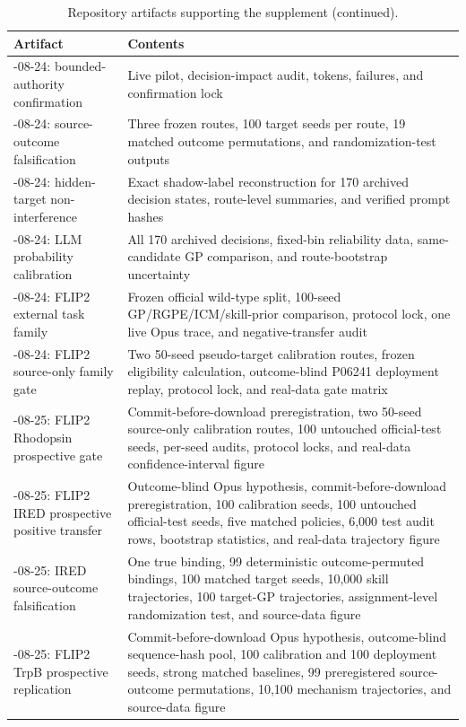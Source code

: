 \documentclass[pdflatex,sn-nature]{sn-jnl}
\begin{document}
\begin{appendices}
\begin{table}[!htbp]
\centering
\caption{Repository artifacts supporting the supplement (continued).}
\label{tab:artifact_map_continued}
\small
\begin{tabularx}{\textwidth}{>{\raggedright\arraybackslash}p{6.2cm}X}
\toprule
Artifact & Contents \\
\midrule
2026-08-24: bounded-authority confirmation & Live pilot, decision-impact audit, tokens, failures, and confirmation lock \\
2026-08-24: source-outcome falsification & Three frozen routes, 100 target seeds per route, 19 matched outcome permutations, and randomization-test outputs \\
2026-08-24: hidden-target non-interference & Exact shadow-label reconstruction for 170 archived decision states, route-level summaries, and verified prompt hashes \\
2026-08-24: LLM probability calibration & All 170 archived decisions, fixed-bin reliability data, same-candidate GP comparison, and route-bootstrap uncertainty \\
2026-08-24: FLIP2 external task family & Frozen official wild-type split, 100-seed GP/RGPE/ICM/skill-prior comparison, protocol lock, one live Opus trace, and negative-transfer audit \\
2026-08-24: FLIP2 source-only family gate & Two 50-seed pseudo-target calibration routes, frozen eligibility calculation, outcome-blind P06241 deployment replay, protocol lock, and real-data gate matrix \\
2026-08-25: FLIP2 Rhodopsin prospective gate & Commit-before-download preregistration, two 50-seed source-only calibration routes, 100 untouched official-test seeds, per-seed audits, protocol locks, and real-data confidence-interval figure \\
2026-08-25: FLIP2 IRED prospective positive transfer & Outcome-blind Opus hypothesis, commit-before-download preregistration, 100 calibration seeds, 100 untouched official-test seeds, five matched policies, 6,000 test audit rows, bootstrap statistics, and real-data trajectory figure \\
2026-08-25: IRED source-outcome falsification & One true binding, 99 deterministic outcome-permuted bindings, 100 matched target seeds, 10,000 skill trajectories, 100 target-GP trajectories, assignment-level randomization test, and source-data figure \\
2026-08-25: FLIP2 TrpB prospective replication & Commit-before-download Opus hypothesis, outcome-blind sequence-hash pool, 100 calibration and 100 deployment seeds, strong matched baselines, 99 preregistered source-outcome permutations, 10,100 mechanism trajectories, and source-data figure \\
\bottomrule
\end{tabularx}
\end{table}


\end{appendices}
\end{document}
